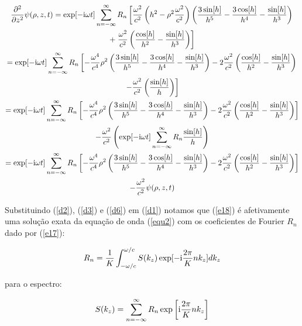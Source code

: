 \begin{multline}  \label{d6}
\frac{\partial^2}{\partial z^2} \psi (\rho, z, t)  =  \exp[-{\rm i}\omega t]\sum\limits_{n=-\infty}^{\infty}R_n \left[ \frac{\omega^2}{c^2 }\left(   h^2- \rho^2\frac{\omega^2}{c^2} \right)\left( \frac{3 \sin[h]}{h^5}-\frac{3\cos[h]}{h^4}-\frac{\sin[h]}{h^3}\right) \right. \\
+\left. \frac{\omega^2}{c^2} \left(\frac{\cos[h]}{h^2}-\frac{\sin[h]}{h^3}\right) \right] \\
=  \exp[-{\rm i}\omega t]\sum\limits_{n=-\infty}^{\infty}R_n  \left[ -\frac{\omega^4}{c^4}\rho^2\left( \frac{3 \sin[h]}{h^5}-\frac{3\cos[h]}{h^4}-\frac{\sin[h]}{h^3}\right) -2\frac{\omega^2}{c^2}\left( \frac{\cos[h]}{h^2}-\frac{ \sin[h]}{h^3}\right)\right. \\
 \left. -\frac{\omega^2}{c^2}\left(\frac{\sin[h]}{h}\right) \right] \\
=  \exp[-{\rm i}\omega t]\sum\limits_{n=-\infty}^{\infty}R_n  \left[ -\frac{\omega^4}{c^4}\rho^2\left( \frac{3 \sin[h]}{h^5}-\frac{3\cos[h]}{h^4}-\frac{\sin[h]}{h^3}\right) -2\frac{\omega^2}{c^2}\left( \frac{\cos[h]}{h^2}-\frac{ \sin[h]}{h^3}\right)\right] \\
 -\frac{\omega^2}{c^2}\left(\exp[-{\rm i}\omega t]\sum\limits_{n=-\infty}^{\infty}R_n\frac{\sin[h]}{h}\right)\\
=  \exp[-{\rm i}\omega t]\sum\limits_{n=-\infty}^{\infty}R_n  \left[ -\frac{\omega^4}{c^4}\rho^2\left( \frac{3 \sin[h]}{h^5}-\frac{3\cos[h]}{h^4}-\frac{\sin[h]}{h^3}\right) -2\frac{\omega^2}{c^2}\left( \frac{\cos[h]}{h^2}-\frac{ \sin[h]}{h^3}\right)\right] \\
  -\frac{\omega^2}{c^2}\psi(\rho, z, t)
\end{multline}

Substituindo (\ref{d2}), (\ref{d3}) e (\ref{d6}) em (\ref{d1}) notamos que (\ref{e18}) é afetivamente uma solução exata da equação de onda (\ref{equ2}) com os coeficientes de Fourier $R_n$ dado por (\ref{e17}):

\begin{equation}\label{e17U}
  R_n=\frac{1}{K}\int_{-\omega/c}^{\omega/c} S(k_z)\exp[-{\rm i}\frac{2\pi}{K}n k_z]dk_z
\end{equation}

para o espectro:

\begin{equation}\label{e16U}
  S(k_{z})= \sum\limits_{n=-\infty}^{\infty}R_n \exp\left[{\rm i}\frac{2\pi}{K}n k_{z}\right]
\end{equation}
